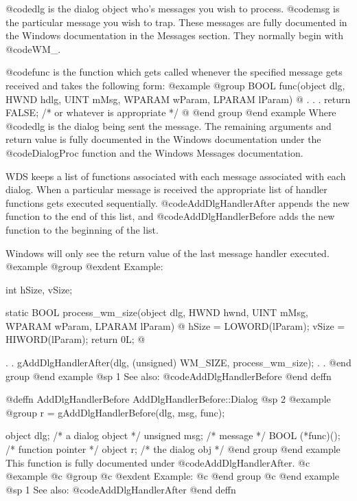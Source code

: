 @code{dlg} is the dialog object who's messages you wish to process.
@code{msg} is the particular message you wish to trap.  These messages
are fully documented in the Windows documentation in the Messages
section.  They normally begin with @code{WM_}.

@code{func} is the function which gets called whenever the specified
message gets received and takes the following form:
@example
@group
BOOL    func(object     dlg,
             HWND       hdlg, 
             UINT       mMsg, 
             WPARAM     wParam, 
             LPARAM     lParam)
@{
        .
        .
        .
        return FALSE;  /* or whatever is appropriate  */
@}
@end group
@end example
Where @code{dlg} is the dialog being sent the message.  The remaining
arguments and return value is fully documented in the Windows documentation
under the @code{DialogProc} function and the Windows Messages documentation.

WDS keeps a list of functions associated with each message associated
with each dialog.  When a particular message is received the appropriate
list of handler functions gets executed sequentially.
@code{AddDlgHandlerAfter} appends the new function to the end of this list,
and @code{AddDlgHandlerBefore} adds the new function to the beginning of
the list.

Windows will only see the return value of the last message handler executed.
@example
@group
@exdent Example:

int     hSize, vSize;

static  BOOL    process_wm_size(object  dlg, 
                                HWND    hwnd, 
                                UINT    mMsg, 
                                WPARAM  wParam, 
                                LPARAM  lParam)
@{
        hSize = LOWORD(lParam);
        vSize = HIWORD(lParam);
        return 0L;
@}

        .
        .
        gAddDlgHandlerAfter(dlg, (unsigned) WM_SIZE,
                                      process_wm_size);
        .
        .
@end group
@end example
@sp 1
See also:  @code{AddDlgHandlerBefore}
@end deffn












@deffn {AddDlgHandlerBefore} AddDlgHandlerBefore::Dialog
@sp 2
@example
@group
r = gAddDlgHandlerBefore(dlg, msg, func);

object   dlg;     /*  a dialog object  */
unsigned msg;      /*  message          */
BOOL    (*func)(); /*  function pointer */
object  r;         /*  the dialog obj   */
@end group
@end example
This function is fully documented under @code{AddDlgHandlerAfter}.
@c @example
@c @group
@c @exdent Example:
@c @end group
@c @end example
@sp 1
See also:  @code{AddDlgHandlerAfter}
@end deffn













